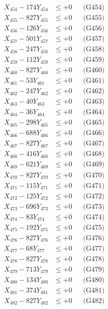 \documentclass[a4paper,10pt]{article}
\begin{document}
{\begin{align}
X_{454} - 174Y_{454} &\leq +0 && \text{(G454)} \\
X_{455} - 827Y_{455} &\leq +0 && \text{(G455)} \\
X_{456} - 126Y_{456} &\leq +0 && \text{(G456)} \\
X_{457} - 501Y_{457} &\leq +0 && \text{(G457)} \\
X_{458} - 247Y_{458} &\leq +0 && \text{(G458)} \\
X_{459} - 112Y_{459} &\leq +0 && \text{(G459)} \\
X_{460} - 827Y_{460} &\leq +0 && \text{(G460)} \\
\allowbreak
X_{461} - 53Y_{461} &\leq +0 && \text{(G461)} \\
X_{462} - 247Y_{462} &\leq +0 && \text{(G462)} \\
X_{463} - 40Y_{463} &\leq +0 && \text{(G463)} \\
X_{464} - 36Y_{464} &\leq +0 && \text{(G464)} \\
X_{465} - 298Y_{465} &\leq +0 && \text{(G465)} \\
X_{466} - 688Y_{466} &\leq +0 && \text{(G466)} \\
X_{467} - 827Y_{467} &\leq +0 && \text{(G467)} \\
X_{468} - 416Y_{468} &\leq +0 && \text{(G468)} \\
X_{469} - 621Y_{469} &\leq +0 && \text{(G469)} \\
X_{470} - 827Y_{470} &\leq +0 && \text{(G470)} \\
\allowbreak
X_{471} - 115Y_{471} &\leq +0 && \text{(G471)} \\
X_{472} - 125Y_{472} &\leq +0 && \text{(G472)} \\
X_{473} - 696Y_{473} &\leq +0 && \text{(G473)} \\
X_{474} - 83Y_{474} &\leq +0 && \text{(G474)} \\
X_{475} - 192Y_{475} &\leq +0 && \text{(G475)} \\
X_{476} - 827Y_{476} &\leq +0 && \text{(G476)} \\
X_{477} - 68Y_{477} &\leq +0 && \text{(G477)} \\
X_{478} - 827Y_{478} &\leq +0 && \text{(G478)} \\
X_{479} - 713Y_{479} &\leq +0 && \text{(G479)} \\
X_{480} - 134Y_{480} &\leq +0 && \text{(G480)} \\
\allowbreak
X_{481} - 374Y_{481} &\leq +0 && \text{(G481)} \\
X_{482} - 827Y_{482} &\leq +0 && \text{(G482)} \\

\end{align}}
\end{document}
